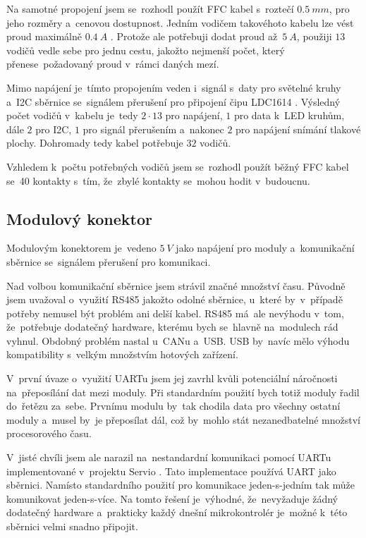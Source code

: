 Na samotné propojení jsem se~rozhodl použít FFC kabel s~roztečí \(0.5~mm\), pro jeho rozměry a~cenovou dostupnost.
Jedním vodičem takovéhoto kabelu lze vést proud maximálně \(0.4~A\) \cite{FFC-konektor}.
Protože ale potřebuji dodat proud až~\(5~A\), použiji \(13\) vodičů vedle sebe pro jednu cestu, jakožto nejmenší počet, který přenese~požadovaný proud v~rámci daných mezí.

Mimo napájení je~tímto propojením veden i~signál s~daty pro světelné kruhy a~I2C sběrnice se~signálem přerušení pro připojení čipu LDC1614 \cite{LDC1614}.
Výsledný počet vodičů v~kabelu je~tedy \(2 \cdot 13\) pro napájení, \(1\) pro data k~LED kruhům, dále \(2\) pro I2C, \(1\) pro signál přerušením a~nakonec \(2\) pro napájení snímání tlakové plochy.
Dohromady tedy kabel potřebuje \(32\) vodičů. 

Vzhledem k~počtu potřebných vodičů jsem se~rozhodl použít běžný FFC kabel se~40 kontakty s~tím, že~zbylé kontakty se~mohou hodit v~budoucnu.

\subsection{Modulový konektor \label{sec:ModulovyKonektor}}
Modulovým konektorem je~vedeno \(5~V\) jako napájení pro moduly a~komunikační sběrnice se~signálem přerušení pro komunikaci.

Nad volbou komunikační sběrnice jsem strávil značné množství času.
Původně jsem uvažoval o~využití RS485 jakožto odolné sběrnice, u~které by~v~případě potřeby nemusel být problém ani delší kabel.
RS485 má~ale nevýhodu v~tom, že~potřebuje dodatečný hardware, kterému bych se~hlavně na~modulech rád vyhnul.
Obdobný problém nastal u~CANu a~USB.
USB by~navíc mělo výhodu kompatibility s~velkým množstvím hotových zařízení.

V~první úvaze o~využití UARTu jsem jej zavrhl kvůli potenciální náročnosti na~přeposílání dat mezi moduly.
Při standardním použití bych totiž moduly řadil do~řetězu za~sebe.
Prvnímu modulu by~tak chodila data pro všechny ostatní moduly a~musel by~je přeposílat dál, což by~mohlo stát nezanedbatelné množství procesorového času.

V~jisté chvíli jsem ale narazil na~nestandardní komunikaci pomocí UARTu implementované v~projektu Servio \cite{Servio}.
Tato implementace používá UART jako sběrnici.
Namísto standardního použití pro komunikace jeden-s-jedním tak může komunikovat jeden-s-více.
Na tomto řešení je~výhodné, že~nevyžaduje žádný dodatečný hardware a~prakticky každý dnešní mikrokontrolér je~možné k~této sběrnici velmi snadno připojit.

